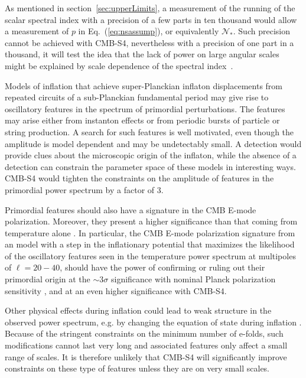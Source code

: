 As mentioned in section~\ref{sec:upperLimits}, a measurement of the running of the scalar spectral index with a precision of a few parts in ten thousand would allow a measurement of $p$ in Eq.~(\ref{eq:nsassump}), or equivalently $\mathcal{N}_\ast$. Such precision cannot be achieved with CMB-S4, nevertheless with a precision of one part in a thousand, it will test the idea that the lack of power on large angular scales might be explained by scale dependence of the spectral index~\cite{Meerburg:2014bpa}.  

Models of inflation that achieve super-Planckian inflaton displacements from repeated circuits of a sub-Planckian fundamental period may give rise to oscillatory features in the spectrum of primordial perturbations. The features may arise either from instanton effects or from periodic bursts of particle or string production. A search for such features is well motivated, even though the amplitude is model dependent and may be undetectably small. A detection would provide clues about the microscopic origin of the inflaton, while the absence of a detection can constrain the parameter space of these models in interesting ways. CMB-S4 would tighten the constraints on the amplitude of features in the primordial power spectrum by a factor of 3. 

Primordial features should also have a signature in the CMB E-mode polarization. Moreover, they present a higher significance than that coming from temperature alone \cite{Dvorkin:2007jp}. In particular, the CMB E-mode polarization signature from an model with a step in the inflationary potential that maximizes the likelihood of the oscillatory features seen in the temperature power spectrum at multipoles of $\ell= 20-40$, should have the power of confirming or ruling out their primordial origin at the $\sim 3\sigma$ significance with nominal Planck polarization sensitivity \cite{Mortonson:2009qv,Dvorkin:2011ui,Miranda:2014fwa}, and at an even higher significance with CMB-S4.

Other physical effects during inflation could lead to weak structure in the observed power spectrum, e.g. by changing the equation of state during inflation \cite{Achucarro:2014msa}. Because of the stringent constraints on the minimum number of e-folds, such modifications cannot last very long and associated features only affect a small range of scales. It is therefore unlikely that CMB-S4 will significantly improve constraints on these type of features unless they are on very small scales. 



